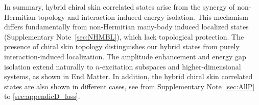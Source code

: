 \documentclass[longbibliography, aps, prx, amsmath, amssymb, amsfonts, twocolumn,superscriptaddress, footinbib]{revtex4-1}
\begin{document}
	{
	In summary, hybrid chiral skin correlated states arise from the 
	synergy of non-Hermitian topology and interaction-induced energy 
	isolation. This mechanism differs fundamentally from non-Hermitian 
	many-body induced localized states (Supplementary Note~\ref{sec:NHMBL}), 
	which lack topological protection. %
	The presence of chiral skin topology distinguishes our hybrid states 
    from purely interaction-induced localization.
	The amplitude enhancement and energy gap isolation extend naturally to 
	$n$-excitation subspaces and higher-dimensional systems, as shown in End Matter. 
	}
	In addition, the hybrid chiral skin correlated states are also shown in different cases, see from Supplementary Note~\ref{sec:AllP} to \ref{sec:appendicD_loss}.

\end{document}
